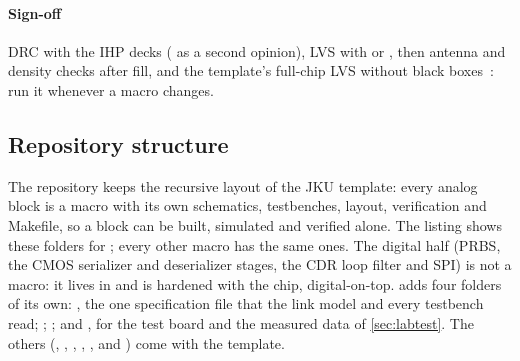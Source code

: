 \paragraph{Sign-off} DRC with the IHP  decks ( as a second opinion), LVS with  or , then antenna and density checks after fill, and the template's full-chip LVS without black boxes~\cite{jkutemplate}: run it whenever a macro changes.

\subsection{Repository structure}\label{sec:ch15-repo}

The \OS{} repository keeps the recursive layout of the JKU template: every analog block is a macro with its own schematics, testbenches, layout, verification and Makefile, so a block can be built, simulated and verified alone. The listing shows these folders for ; every other macro has the same ones. The digital half (PRBS, the CMOS serializer and deserializer stages, the CDR loop filter and SPI) is not a macro: it lives in  and is hardened with the chip, digital-on-top. \OS{} adds four folders of its own: , the one specification file that the link model and every testbench read; ; ; and , for the test board and the measured data of \cref{sec:labtest}. The others (, , , , ,  and ) come with the template.


